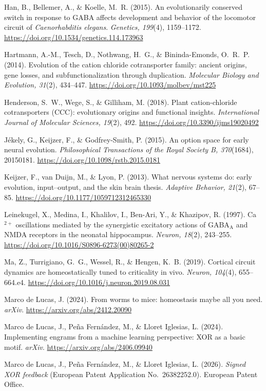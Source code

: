 \documentclass[11pt,a4paper]{article}
\newenvironment{apabib}{\raggedright\begin{list}{}{%
  \setlength{\leftmargin}{1.6em}\setlength{\itemindent}{-1.6em}%
  \setlength{\itemsep}{3pt}\setlength{\parsep}{0pt}\setlength{\topsep}{4pt}}}%
  {\end{list}}
\begin{document}
\begin{apabib}
\item Han, B., Bellemer, A., \& Koelle, M.~R. (2015). An evolutionarily conserved switch in response to GABA affects development and behavior of the locomotor circuit of \emph{Caenorhabditis elegans}. \emph{Genetics, 199}(4), 1159--1172. \url{https://doi.org/10.1534/genetics.114.173963}
\item Hartmann, A.-M., Tesch, D., Nothwang, H.~G., \& Bininda-Emonds, O.~R.~P. (2014). Evolution of the cation chloride cotransporter family: ancient origins, gene losses, and subfunctionalization through duplication. \emph{Molecular Biology and Evolution, 31}(2), 434--447. \url{https://doi.org/10.1093/molbev/mst225}
\item Henderson, S.~W., Wege, S., \& Gilliham, M. (2018). Plant cation-chloride cotransporters (CCC): evolutionary origins and functional insights. \emph{International Journal of Molecular Sciences, 19}(2), 492. \url{https://doi.org/10.3390/ijms19020492}
\item J\'ekely, G., Keijzer, F., \& Godfrey-Smith, P. (2015). An option space for early neural evolution. \emph{Philosophical Transactions of the Royal Society B, 370}(1684), 20150181. \url{https://doi.org/10.1098/rstb.2015.0181}
\item Keijzer, F., van Duijn, M., \& Lyon, P. (2013). What nervous systems do: early evolution, input--output, and the skin brain thesis. \emph{Adaptive Behavior, 21}(2), 67--85. \url{https://doi.org/10.1177/1059712312465330}
\item Leinekugel, X., Medina, I., Khalilov, I., Ben-Ari, Y., \& Khazipov, R. (1997). Ca$^{2+}$ oscillations mediated by the synergistic excitatory actions of GABA$_{\mathrm{A}}$ and NMDA receptors in the neonatal hippocampus. \emph{Neuron, 18}(2), 243--255. \url{https://doi.org/10.1016/S0896-6273(00)80265-2}
\item Ma, Z., Turrigiano, G.~G., Wessel, R., \& Hengen, K.~B. (2019). Cortical circuit dynamics are homeostatically tuned to criticality in vivo. \emph{Neuron, 104}(4), 655--664.e4. \url{https://doi.org/10.1016/j.neuron.2019.08.031}
\item Marco de Lucas, J. (2024). From worms to mice: homeostasis maybe all you need. \emph{arXiv}. \url{https://arxiv.org/abs/2412.20090}
\item Marco de Lucas, J., Pe\~na Fern\'andez, M., \& Lloret Iglesias, L. (2024). Implementing engrams from a machine learning perspective: XOR as a basic motif. \emph{arXiv}. \url{https://arxiv.org/abs/2406.09940}
\item Marco de Lucas, J., Pe\~na Fern\'andez, M., \& Lloret Iglesias, L. (2026). \emph{Signed XOR feedback} (European Patent Application No.~26382252.0). European Patent Office.

\end{apabib}
\end{document}
